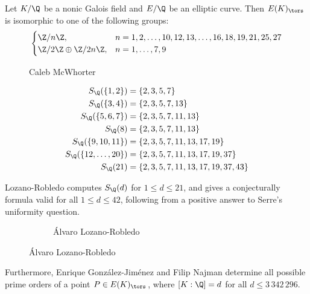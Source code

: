 \begin{frame}[plain]
\begin{thm}[M.]
Let $K/\Q$ be a nonic Galois field and $E/\Q$ be an elliptic curve. Then $E(K)_\tors$ is isomorphic to one of the following groups:
	\[
	\begin{cases}
	\Z/n\Z, & n= 1,2,\ldots,10,12,13,\ldots,16,18,19,21,25,27  \\
	\Z/2\Z \oplus \Z/2n\Z, & n= 1,\ldots,7,9
	\end{cases}
	\]
\end{thm}
	\begin{figure}
	\captionsetup{labelformat=empty}
	\centering
	\caption{Caleb McWhorter}
	\end{figure}
\end{frame}


\begin{frame}[plain]
	\begin{thm}
		\[
		\begin{split}
		S_\Q(\{1,2\})&= \{ 2,3,5,7 \} \\
		S_\Q(\{3,4\})&= \{ 2,3,5,7,13 \} \\
		S_\Q(\{5,6,7\})&= \{ 2,3,5,7,11,13 \} \\
		S_\Q(8)&= \{ 2,3,5,7,11,13 \} \\
		S_\Q(\{9,10,11\})&= \{ 2,3,5,7,11,13,17,19 \} \\
		S_\Q(\{12,\ldots,20\})&= \{2,3,5,7,11,13,17,19,37 \} \\
		S_\Q(21)&= \{ 2,3,5,7,11,13,17,19,37,43 \}
		\end{split}
		\]
	\end{thm}
\end{frame}


\begin{frame}[plain]
\begin{rem}
Lozano-Robledo computes $S_\Q(d)$ for $1 \leq d \leq 21$, and gives a conjecturally formula valid for all $1 \leq d \leq 42$, following from a positive answer to Serre's uniformity question.
\end{rem}
	\begin{figure}[h]
	\centering
	\begin{subfigure}{\textwidth}
	\captionsetup{labelformat=empty}
	\centering
	\caption{\'Alvaro Lozano-Robledo}
	\end{subfigure}
	\end{figure}
\begin{rem}
Furthermore, Enrique Gonz\'alez-Jim\'enez and Filip Najman determine all possible prime orders of a point $P \in E(K)_\tors$, where $[K : \Q]= d$ for all $d \leq 3\,342\,296$.
\end{rem}
\end{frame}



